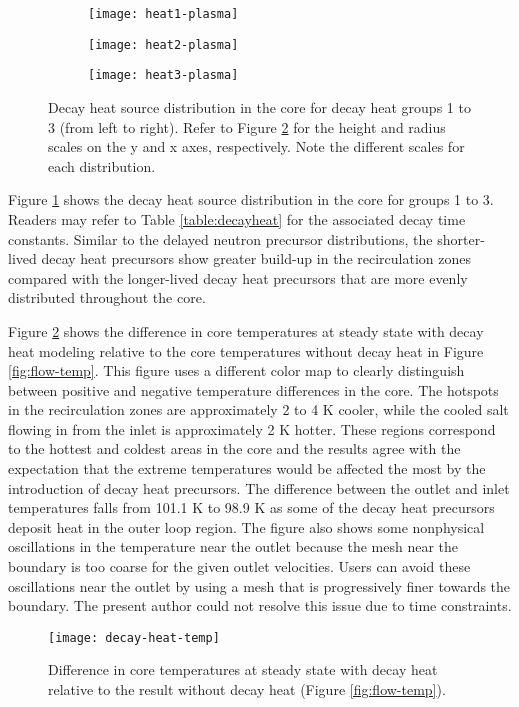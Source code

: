 \begin{figure}[htbp!]
    \centering
    \begin{subfigure}[t]{.325\textwidth}
        \centering
        \texttt{[image: heat1-plasma]}
    \end{subfigure}
    \begin{subfigure}[t]{.325\textwidth}
        \centering
        \texttt{[image: heat2-plasma]}
    \end{subfigure}
    \begin{subfigure}[t]{.325\textwidth}
        \centering
        \texttt{[image: heat3-plasma]}
    \end{subfigure}
    \caption{Decay heat source distribution in the core for decay heat groups
    1 to 3 (from left to right). Refer to Figure \ref{fig:decayheattemp} for
    the height and radius scales on the y and x axes, respectively. Note the
    different scales for each distribution.}
    \label{fig:decayheat}
\end{figure}

Figure \ref{fig:decayheat} shows the decay heat source distribution in the
core for groups 1 to 3. Readers may refer to Table
\ref{table:decayheat} for the associated decay time constants.
Similar to the delayed neutron precursor distributions, the shorter-lived
decay heat precursors show greater build-up in the recirculation zones
compared with the longer-lived decay heat precursors that are more evenly
distributed throughout the core.

Figure \ref{fig:decayheattemp} shows the
difference in core temperatures at steady state with decay heat modeling
relative to the core temperatures without decay heat in Figure
\ref{fig:flow-temp}. This figure uses a different color map to clearly
distinguish between positive and negative temperature differences in the core.
The hotspots in the recirculation zones are approximately
2 to 4 K cooler, while the cooled salt flowing in from the inlet is
approximately 2 K hotter. These regions correspond to the hottest and coldest
areas in the core and the results agree with the expectation that the extreme
temperatures would be affected the most by the introduction of decay heat
precursors. The difference between the outlet and inlet temperatures falls
from 101.1 K to 98.9 K as some of the decay heat precursors deposit heat in
the outer loop region. The figure also shows some nonphysical oscillations in
the temperature near the outlet because the mesh near the boundary is too
coarse for the given outlet velocities. Users can avoid these oscillations
near the outlet by using a mesh
that is progressively finer towards the boundary. The
present author could not resolve this issue due to time constraints.

\begin{figure}[htbp!]
    \centering
    \texttt{[image: decay-heat-temp]}
    \caption{Difference in core temperatures at steady state with decay heat
    relative to the result without decay heat (Figure \ref{fig:flow-temp}).}
    \label{fig:decayheattemp}
\end{figure}
